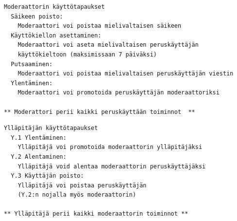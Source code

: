 \documentclass[10pt]{article}
\begin{document}
\newpage

\begin{Verbatim}[frame=single]
Moderaattorin käyttötapaukset
  Säikeen poisto:
    Moderaattori voi poistaa mielivaltaisen säikeen
  Käyttökiellon asettaminen:
    Moderaattori voi aseta mielivaltaisen peruskäyttäjän 
    käyttökieltoon (maksimissaan 7 päiväksi)
  Putsaaminen:
    Moderaattori voi poistaa mielivaltaisen peruskäyttäjän viestin
  Ylentäminen:
    Moderaattori voi promotoida peruskäyttäjän moderaattoriksi
    
** Moderattori perii kaikki peruskäyttään toiminnot  **
\end{Verbatim}

\begin{Verbatim}[frame=single]
Ylläpitäjän käyttötapaukset
  Y.1 Ylentäminen:
    Ylläpitäjä voi promotoida moderaattorin ylläpitäjäksi
  Y.2 Alentaminen:
    Ylläpitäjä void alentaa moderaattorin peruskäyttäjäksi
  Y.3 Käyttäjän poisto:
    Ylläpitäjä voi poistaa peruskäyttäjän
    (Y.2:n nojalla myös moderaattorin)
    
** Ylläpitäjä perii kaikki moderaattorin toiminnot **
\end{Verbatim}
\end{document}
